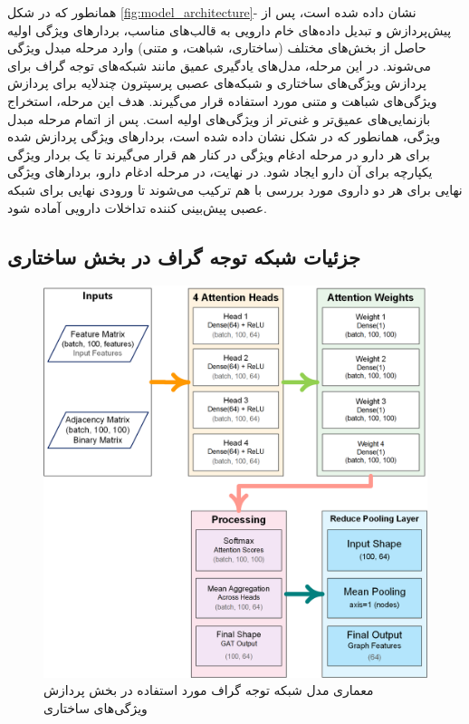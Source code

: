 همانطور که در شکل \ref{fig:model_architecture}- نشان داده شده است، پس از پیش‌پردازش و تبدیل داده‌های خام دارویی به قالب‌های مناسب، بردارهای ویژگی اولیه حاصل از بخش‌های مختلف (ساختاری، شباهت، و متنی) وارد مرحله مبدل ویژگی می‌شوند. در این مرحله، مدل‌های یادگیری عمیق مانند شبکه‌های توجه گراف برای پردازش ویژگی‌های ساختاری و شبکه‌های عصبی پرسپترون چندلایه برای پردازش ویژگی‌های شباهت و متنی مورد استفاده قرار می‌گیرند. هدف این مرحله، استخراج بازنمایی‌های عمیق‌تر و غنی‌تر از ویژگی‌های اولیه است. پس از اتمام مرحله مبدل ویژگی، همانطور که در شکل نشان داده شده است، بردارهای ویژگی پردازش شده برای هر دارو در مرحله ادغام ویژگی در کنار هم قرار می‌گیرند تا یک بردار ویژگی یکپارچه برای آن دارو ایجاد شود. در نهایت، در مرحله ادغام دارو، بردارهای ویژگی نهایی برای هر دو داروی مورد بررسی با هم ترکیب می‌شوند تا ورودی نهایی برای شبکه عصبی پیش‌بینی کننده تداخلات دارویی آماده شود.

\subsection{جزئیات شبکه توجه گراف در بخش ساختاری}

\begin{figure}[t]
	\centering
	\includegraphics[width=\textwidth]{images/gat-model.png}
	\caption{معماری مدل شبکه توجه گراف مورد استفاده در بخش پردازش ویژگی‌های ساختاری}
	\label{fig:gat_model}
\end{figure}

